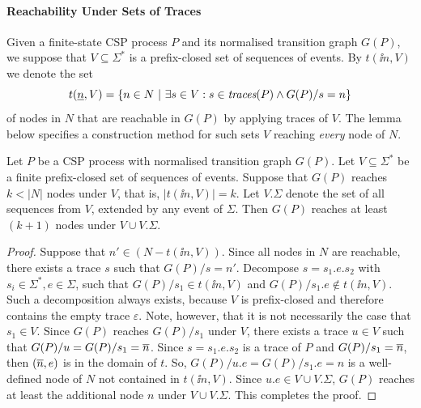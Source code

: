 \paragraph{Reachability Under Sets of Traces} \label{sec:V} Given a finite-state CSP
process $P$ and its normalised transition graph $G(P)$,
we suppose that $V\subseteq\Sigma^*$ is a prefix-closed set  of sequences of
events. By $t(\ii n,V)$ we denote the set
\[
t(\underline{n},V) = \{ n\in N~|~\exists s\in V: s\in\text{\it traces}(P)\wedge G(P)/s = n \}
\]
of nodes in $N$ that are reachable in $G(P)$ by applying traces of $V$. The
lemma below specifies a construction method for such sets $V$ reaching {\it
every} node of $N$.

\begin{lemma}
\label{lemma:extendV} Let $P$ be a CSP process with normalised transition
graph $G(P)$. Let $V\subseteq\Sigma^*$ be a finite prefix-closed set of
sequences of events. Suppose that  $G(P)$ reaches $k < |N|$ nodes under $V$,
that is, $|t(\ii n,V)| = k$. Let $V.\Sigma$ denote the set of all sequences
from $V$, extended by any event of $\Sigma$.  Then $G(P)$ reaches at least
$(k+1)$ nodes under $V\cup V.\Sigma$.
\end{lemma}
\begin{proof}
Suppose that $n'\in (N - t(\ii n,V))$.  Since all nodes in $N$ are reachable,
there exists a trace $s$ such that $G(P)/s = n'$. Decompose $s = s_1.e.s_2$
with $s_i\in\Sigma^*, e\in\Sigma$, such that $G(P)/s_1 \in t(\ii n,V)$ and
$G(P)/s_1.e \not\in t(\ii n,V)$. Such a decomposition always exists, because
$V$ is prefix-closed and therefore contains the empty trace $\varepsilon$.
Note, however, that it is not necessarily the case that $s_1\in V$. Since
$G(P)$ reaches $G(P)/s_1$ under $V$, there exists a trace $u\in V$ such that
$G(P)/u = G(P)/s_1 = \overline n$. Since $s = s_1.e.s_2$ is a trace of $P$ and
$G(P)/s_1 = \overline n$, then $(\overline n,e)$ is in the domain of $t$. So, $ G(P)/u.e
= G(P)/s_1.e = n$ is a well-defined node of $N$ not contained in $t(\ii
n,V)$. Since $u.e\in V\cup V.\Sigma$, $G(P)$ reaches at least the additional
node $n$ under $V\cup V.\Sigma$. This completes the proof. \xbox
\end{proof}

